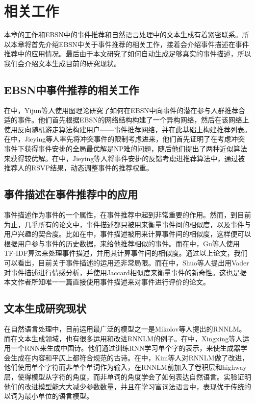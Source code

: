 \documentclass[]{template}
\begin{document}
\section{相关工作}
本章的工作和EBSN中的事件推荐和自然语言处理中的文本生成有着紧密联系。所以本章将首先介绍EBSN中关于事件推荐的相关工作，接着会介绍事件描述在事件推荐中的应用情况。最后由于本文研究了如何自动生成足够真实的事件描述，所以我们会介绍文本生成目前的研究现状。
\subsection{EBSN中事件推荐的相关工作}
在\cite{EBSN_event_reco}中，Yijun等人使用图理论研究了如何在EBSN中向事件的潜在参与人群推荐合适的事件。他们首先根据EBSN的网络结构构建了一个异构网络，然后在该网络上使用反向随机游走算法构建用户——事件推荐网络，并在此基础上构建推荐列表。在\cite{EBSN_conflict-aware_2016}中，Jieying等人率先将冲突事件的限制考虑进来，他们首先证明了在考虑冲突事件下获得事件安排的全局最优解是NP难的问题，随后他们提出了两种近似算法来获得较优解。在\cite{EBSN_feedback-aware_2017}中，Jieying等人将事件安排的反馈考虑进推荐算法中，通过被推荐人的RSVP结果，动态调整事件的推荐权重。

\subsection{事件描述在事件推荐中的应用}
事件描述作为事件的一个属性，在事件推荐中起到非常重要的作用。然而，到目前为止，几乎所有的论文中，事件描述都只被用来衡量事件间的相似度，以及事件与用户兴趣的契合度。比如在\cite{EBSN_who_will}中，事件描述被用来计算事件间的相似度，这样便可以根据用户参与事件的历史数据，来给他推荐相似的事件。而在\cite{gu_context_2016}中，Gu等人使用TF-IDF算法来处理事件描述，并用其计算事件间的相似度。通过以上论文，我们可以看出，目前关于事件描述的运用还非常局限。而在\cite{event_organization_101}中，Shuo等人提出用Vader对事件描述进行情感分析，并使用Jaccard相似度来衡量事件的新奇性。这也是据本文作者所知唯一一篇直接使用事件描述来对事件进行评价的论文。

\subsection{文本生成研究现状}
在自然语言处理中，目前运用最广泛的模型之一是Mikolov等人提出的RNNLM\cite{mikolov_rnnlm_2011}。而在文本生成领域，也有很多运用和改进RNNLM的例子。在\cite{}中，Xingxing等人运用一个RNN来生成中国诗。他们通过训练RNN学习单个字的表示，来使生成器学会生成在内容和平仄上都符合规范的古诗。在\cite{Character-AwareNeuralLanguageModels
}中，Kim等人对RNNLM做了改进，他们使用单个字符而非单个单词作为输入，在RNNLM前加入了卷积层和highway层，使得模型从字符的角度，而非单词的角度学会了如何表达自然语言。实验证明他们的改进模型能大大减少参数数量，并且在学习富词法语言中，表现优于传统的以词为最小单位的语言模型。
\end{document}
